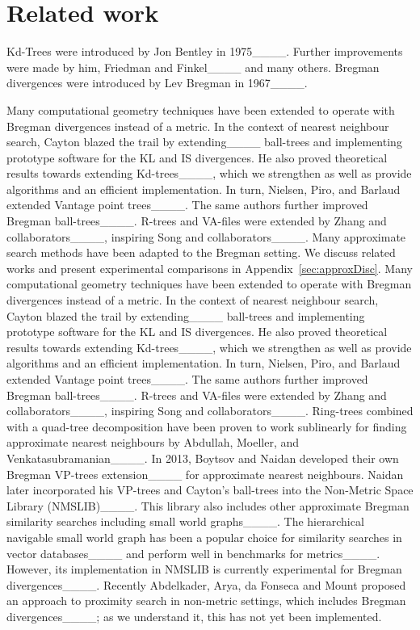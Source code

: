\section{Related work}
\label{sec:related}
Kd-Trees were introduced by Jon Bentley in 1975____. Further improvements were made by him, Friedman and Finkel____ and many others. Bregman divergences were introduced by Lev Bregman in 1967____.

\ifapprox
    Many computational geometry techniques have been extended to operate with Bregman divergences instead of a metric. In the context of nearest neighbour search, Cayton blazed the trail by extending____ ball-trees and implementing prototype software for the KL and IS divergences. He also proved theoretical results towards extending Kd-trees____, which we strengthen as well as provide algorithms and an efficient implementation. In turn, Nielsen, Piro, and Barlaud extended Vantage point trees____. The same authors further improved Bregman ball-trees____. R-trees and VA-files were extended by Zhang and collaborators____, inspiring Song and collaborators____. Many approximate search methods have been adapted to the Bregman setting. We discuss related works and present experimental comparisons in Appendix~\ref{sec:approxDisc}.
\else
    Many computational geometry techniques have been extended to operate with Bregman divergences instead of a metric. In the context of nearest neighbour search, Cayton blazed the trail by extending____ ball-trees and implementing prototype software for the KL and IS divergences. He also proved theoretical results towards extending Kd-trees____, which we strengthen as well as provide algorithms and an efficient implementation. In turn, Nielsen, Piro, and Barlaud extended Vantage point trees____. The same authors further improved Bregman ball-trees____. R-trees and VA-files were extended by Zhang and collaborators____, inspiring Song and collaborators____. Ring-trees combined with a quad-tree decomposition have been proven to work sublinearly for finding approximate nearest neighbours by Abdullah, Moeller, and Venkatasubramanian____. In 2013, Boytsov and Naidan developed their own Bregman VP-trees extension____ for approximate nearest neighbours. Naidan later incorporated his VP-trees and Cayton's ball-trees into the Non-Metric Space Library (NMSLIB)____. This library also includes other approximate Bregman similarity searches including small world graphs____. The hierarchical navigable small world graph has been a popular choice for similarity searches in vector databases____ and perform well in benchmarks for metrics____. However, its implementation in NMSLIB is currently experimental for Bregman divergences____.
    Recently Abdelkader, Arya, da Fonseca and Mount proposed an approach to proximity search in non-metric settings, which includes Bregman divergences____; as we understand it, this has not yet been implemented.
\fi

